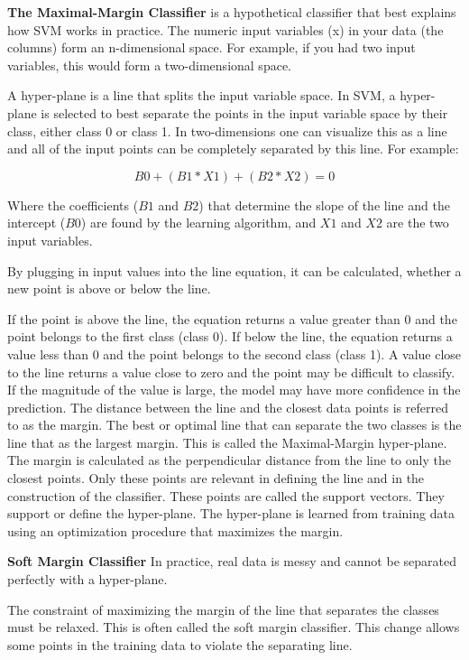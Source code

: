 \documentclass[12pt]{article}
\begin{document}
\textbf{The Maximal-Margin Classifier} is a hypothetical classifier that best explains how SVM works in practice. The numeric input variables (x) in your data (the columns) form an n-dimensional space. For example, if you had two input variables, this would form a two-dimensional space.

A hyper-plane is a line that splits the input variable space. In SVM, a hyper-plane is selected to best separate the points in the input variable space by their class, either class 0 or class 1. In two-dimensions one can visualize this as a line and all of the input points can be completely separated by this line. For example:

$$B0 + (B1 * X1) + (B2 * X2) = 0$$

Where the coefficients ($B1$ and $B2$) that determine the slope of the line and the intercept ($B0$) are found by the learning algorithm, and $X1$ and $X2$ are the two input variables.

By plugging in input values into the line equation, it can be calculated, whether a new point is above or below the line.

If the point is above the line, the equation returns a value greater than 0 and the point belongs to the first class (class 0). If below the line, the equation returns a value less than 0 and the point belongs to the second class (class 1). A value close to the line returns a value close to zero and the point may be difficult to classify. If the magnitude of the value is large, the model may have more confidence in the prediction. The distance between the line and the closest data points is referred to as the margin. The best or optimal line that can separate the two classes is the line that as the largest margin. This is called the Maximal-Margin hyper-plane. The margin is calculated as the perpendicular distance from the line to only the closest points. Only these points are relevant in defining the line and in the construction of the classifier. These points are called the support vectors. They support or define the hyper-plane. The hyper-plane is learned from training data using an optimization procedure that maximizes the margin.

\textbf{Soft Margin Classifier} In practice, real data is messy and cannot be separated perfectly with a hyper-plane.

The constraint of maximizing the margin of the line that separates the classes must be relaxed. This is often called the soft margin classifier. This change allows some points in the training data to violate the separating line.
\end{document}
